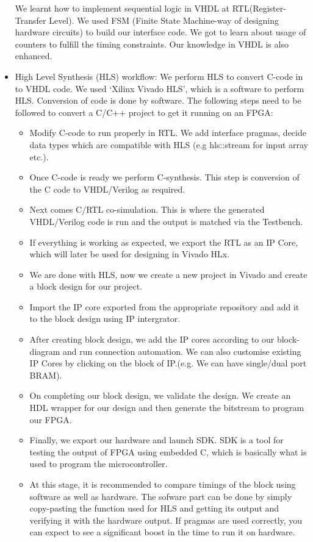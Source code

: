 \documentclass[../../main.tex]{subfiles}
\begin{document}
\begin{itemize}
    We learnt how to implement sequential logic in VHDL at RTL(Register-Transfer Level). We used FSM (Finite State Machine-way of designing hardware circuits) to build our interface code. We got to learn about usage of counters to fulfill the timing constraints. Our knowledge in VHDL is also enhanced.
    \item High Level Synthesis (HLS) workflow: We perform HLS to convert C-code in to VHDL code. We used `Xilinx Vivado HLS', which is a software to perform HLS. Conversion of code is done by software. The following steps need to be followed to convert a C/C++ project to get it running on an FPGA:
    \begin{itemize}
        \item Modify C-code to run properly in RTL. We add interface pragmas, decide data types which are compatible with HLS (e.g hls::stream for input array etc.).
        \item Once C-code is ready we perform C-synthesis. This step is conversion of the C code to VHDL/Verilog as required.
        \item Next comes C/RTL co-simulation. This is where the generated VHDL/Verilog code is run and the output is matched via the Testbench. 
        \item If everything is working as expected, we export the RTL as an IP Core, which will later be used for designing in Vivado HLx.
        \item We are done with HLS, now we create a new project in Vivado and create a block design for our project.
        \item Import the IP core exported from the appropriate repository and add it to the block design using IP intergrator.
        \item After creating block design, we add the IP cores according to our block-diagram and run connection automation. We can also customise existing IP Cores by  clicking on the block of IP.(e.g. We can have single/dual port BRAM).
        \item On completing our block design, we validate the design. We create an HDL wrapper for our design and then generate the bitstream to program our FPGA.
        \item Finally, we export our hardware and launch SDK. SDK is a tool for testing the output of FPGA using embedded C, which is basically what is used to program the microcontroller.
        \item At this stage, it is recommended to compare timings of the block using software as well as hardware. The sofware part can be done by simply copy-pasting the function used for HLS and getting its output and verifying it with the hardware output. If pragmas are used correctly, you can expect to see a significant boost in the time to run it on hardware.
    \end{itemize}
    

\end{itemize}
\end{document}
